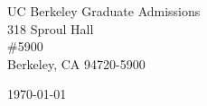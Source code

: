 \begin{minipage}{0.49\textwidth}
\begin{flushleft}
\noindent
UC Berkeley Graduate Admissions\\
318 Sproul Hall\\
\#5900\\
Berkeley, CA 94720-5900
\end{flushleft}
\end{minipage}
\begin{minipage}{0.47\textwidth}
\begin{flushright}
\today
\end{flushright}
\end{minipage} \\

\newcommand{\univ}{University of California, Berkeley}
\newcommand{\univshort}{UC Berkeley}
\newcommand{\degree}{M.Sc./Ph.D.}
\newcommand{\dept}{Computer Science}
